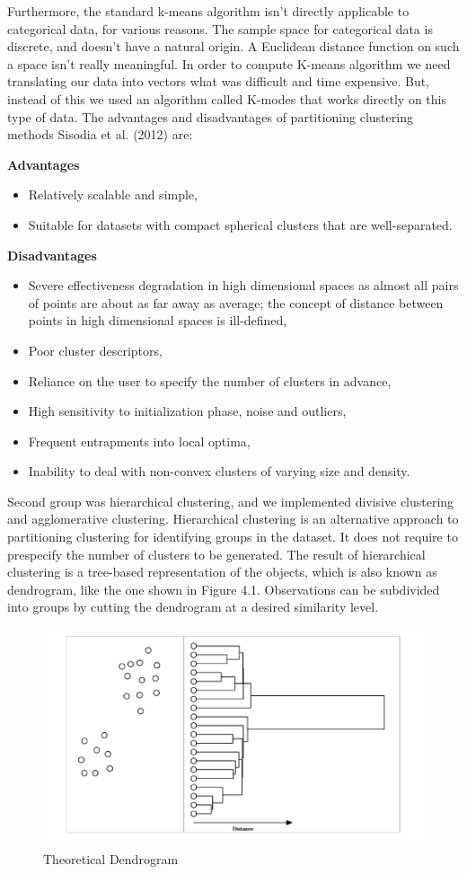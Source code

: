 \documentclass[a4paper,12pt,fleqn]{article}
\begin{document}
Furthermore, the standard k-means algorithm isn't directly applicable to categorical data, for various reasons. The sample space for categorical data is discrete, and doesn't have a natural origin. A Euclidean distance function on such a space isn't really meaningful. In order to compute K-means algorithm we need translating our data into vectors what was difficult and time expensive. But, instead of this we used an algorithm called K-modes that works directly on this type of data. The advantages and disadvantages of partitioning clustering methods Sisodia et al. (2012) are:

\textbf{Advantages}
\begin{itemize}
	\item Relatively scalable and simple,
	\item Suitable for datasets with compact spherical clusters that are well-separated.
\end{itemize}
\textbf{Disadvantages}
\begin{itemize}
	\item Severe effectiveness degradation in high dimensional spaces as almost all pairs of points are about as far away as average; the concept of distance between points in high dimensional spaces is ill-defined,
	\item Poor cluster descriptors,
	\item Reliance on the user to specify the number of clusters in advance,
	\item High sensitivity to initialization phase, noise and outliers,
	\item Frequent entrapments into local optima,
	\item Inability to deal with non-convex clusters of varying size and density.
	
\end{itemize}
Second group was hierarchical clustering, and we implemented divisive clustering and agglomerative clustering. Hierarchical clustering is an alternative approach to partitioning clustering for identifying groups in the dataset. It does not require to prespecify the number of clusters to be generated. The result of hierarchical clustering is a tree-based representation of the objects, which is also known as dendrogram, like the one shown in Figure 4.1. Observations can be subdivided into groups by cutting the dendrogram at a desired similarity level.\\
\begin{figure}[h!]
	\centering
	\includegraphics[width=0.7\linewidth]{21.Dendrogram}
	\caption{Theoretical Dendrogram}
	\label{fig:21}
\end{figure}\\
\end{document}
